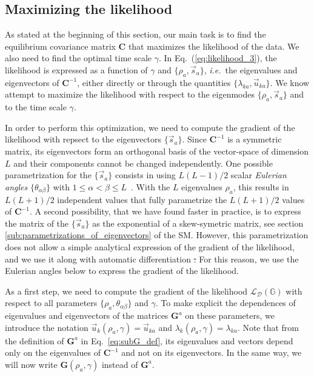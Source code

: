 \documentclass[preprint,amsmath,amssymb,superscriptaddress,showpacs,pre]{revtex4-1}
\newcommand{\ie}{\emph{i.e.}}
\newcommand{\iC}{\bm{C}^{-1}}
\newcommand{\vsa}{\vec{s}_a}
\newcommand{\vuka}{\vec{u}_{ka}}
\newcommand{\pierre}[1]{{\color{red}Pierre: #1}}
\providecommand{\DIFadd}[1]{{\protect\color{blue}\uwave{#1}}} %
\providecommand{\DIFdel}[1]{{\protect\color{red}\sout{#1}}}                      %
\providecommand{\DIFaddbegin}{} %
\providecommand{\DIFaddend}{} %
\providecommand{\DIFdelbegin}{} %
\providecommand{\DIFdelend}{} %
\newcommand{\DIFscaledelfig}{0.5}
\newlength{\DIFdelgraphicswidth} %
\newlength{\DIFdelgraphicsheight} %
\newcommand{\DIFaddincludegraphics}[2][]{{\color{blue}\fbox{\DIFOincludegraphics[#1]{#2}}}} %
\newcommand{\DIFdelincludegraphics}[2][]{%
\sbox{\DIFdelgraphicsbox}{\DIFOincludegraphics[#1]{#2}}%
\settoboxwidth{\DIFdelgraphicswidth}{\DIFdelgraphicsbox} %
\settoboxtotalheight{\DIFdelgraphicsheight}{\DIFdelgraphicsbox} %
\scalebox{\DIFscaledelfig}{%
\parbox[b]{\DIFdelgraphicswidth}{\usebox{\DIFdelgraphicsbox}\\[-\baselineskip] \rule{\DIFdelgraphicswidth}{0em}}\llap{\resizebox{\DIFdelgraphicswidth}{\DIFdelgraphicsheight}{%
\setlength{\unitlength}{\DIFdelgraphicswidth}%
\begin{picture}(1,1)%
\thicklines\linethickness{2pt} %
{\color[rgb]{1,0,0}\put(0,0){\framebox(1,1){}}}%
{\color[rgb]{1,0,0}\put(0,0){\line( 1,1){1}}}%
{\color[rgb]{1,0,0}\put(0,1){\line(1,-1){1}}}%
\end{picture}%
}\hspace*{3pt}}} %
} %
\DeclareRobustCommand{\DIFaddbegin}{\DIFOaddbegin \let\includegraphics\DIFaddincludegraphics} %
\DeclareRobustCommand{\DIFaddend}{\DIFOaddend \let\includegraphics\DIFOincludegraphics} %
\DeclareRobustCommand{\DIFdelbegin}{\DIFOdelbegin \let\includegraphics\DIFdelincludegraphics} %
\DeclareRobustCommand{\DIFdelend}{\DIFOaddend \let\includegraphics\DIFOincludegraphics} %
\begin{document}

\subsection{Maximizing the likelihood} %
\label{sub:maximization_of_the_likelihood}

As stated at the beginning of this section, our main task is to find the equilibrium covariance matrix $\bm C$ that maximizes the likelihood of the data. 
We also need to find the optimal time scale $\gamma$. 
In Eq.~(\eqref{eq:likelihood_3}), the likelihood is expressed as a function of $\gamma$ and $\{\rho_a, \vsa\}$, \ie~the eigenvalues and eigenvectors of $\iC$, either directly or through the quantities $\{\lambda_{ka}, \vuka \}$. 
We know attempt to maximize the likelihood with respect to the eigenmodes $\{\rho_a, \vsa\}$ and to the time scale $\gamma$. 

In order to perform this optimization, we need to compute the gradient of the likelihood with repsect to the eigenvectors $\{\vsa\}$. 
Since $\iC$ is a symmetric matrix, its eigenvectors form an orthogonal basis of the vector-space of dimension $L$ and their components cannot be changed independently.  
One possible parametrization for the $\{\vsa\}$ consists in using $L(L-1)/2$ scalar \emph{Eulerian angles} $\{\theta_{\alpha\beta}\}$ with $1\leq \alpha < \beta \leq L$~\cite{Raffenetti1970GEA, Shepard_param_OM}. 
With the $L$ eigenvalues $\rho_a$, this results in $L(L+1)/2$ independent values that fully parametrize the $L(L+1)/2$ values of $\iC$. 
A second possibility, that we have found faster in practice, is to express the matrix of the $\{\vsa\}$ as the exponential of a skew-symetric matrix, see section \ref{sub:parametrizations_of_eigenvectors} of the SM. 
However, this parametrization does not allow a simple analytical expression of the gradient of the likelihood, and we use it along with automatic differentiation \DIFdelbegin \DIFdel{. }%
\DIFdelend \DIFaddbegin \DIFadd{\mbox{%
\cite{Zygote.jl-2018}}\hspace{0pt}%
. 
}\DIFaddend For this reason, we use the Eulerian angles below to express the gradient of the likelihood. 

As a first step, we need to compute the gradient of the likelihood $\mathcal{L}_{\mathcal{D}}(\mathbb{G})$ with respect to all parameters $\{\rho_a, \theta_{\alpha\beta}\}$ and $\gamma$. 
To make explicit the dependences of eigenvalues and eigenvectors of the matrices $\bm G^a$ on these parameters, we introduce the notation $\vec{u}_k(\rho_a,\gamma) = \vuka$ and $\lambda_k(\rho_a,\gamma) = \lambda_{ka}$. 
Note that from the definition of $\bm G^a$ in Eq.~\eqref{eq:subG_def}, its eigenvalues and vectors depend only on the eigenvalues of $\iC$ and not on its eigenvectors. 
In the same way, we will now write $\bm G(\rho_a,\gamma)$ instead of $\bm G^a$. 
\end{document}
